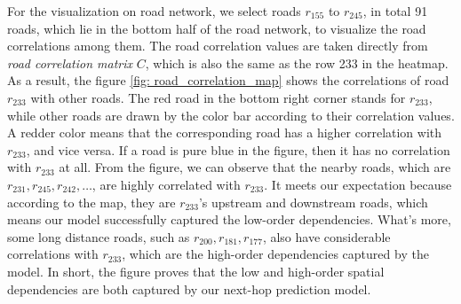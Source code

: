 For the visualization on road network, we select roads $r_{155}$ to $r_{245}$, in total 91 roads, which lie in the bottom half of the road network, to visualize the road correlations among them. The road correlation values are taken directly from \textit{road correlation matrix} $C$, which is also the same as the row 233 in the heatmap. As a result, the figure \ref{fig: road_correlation_map} shows the correlations of road $r_{233}$ with other roads. The red road in the bottom right corner stands for $r_{233}$, while other roads are drawn by the color bar according to their correlation values. A redder color means that the corresponding road has a higher correlation with $r_{233}$, and vice versa. If a road is pure blue in the figure, then it has no correlation with $r_{233}$ at all. From the figure, we can observe that the nearby roads, which are $r_{231}, r_{245}, r_{242}, \dots$, are highly correlated with $r_{233}$. It meets our expectation because according to the map, they are $r_{233}$'s upstream and downstream roads, which means our model successfully captured the low-order dependencies. What's more, some long distance roads, such as $r_{200}, r_{181}, r_{177}$, also have considerable correlations with $r_{233}$, which are the high-order dependencies captured by the model. In short, the figure proves that the low and high-order spatial dependencies are both captured by our next-hop prediction model.


